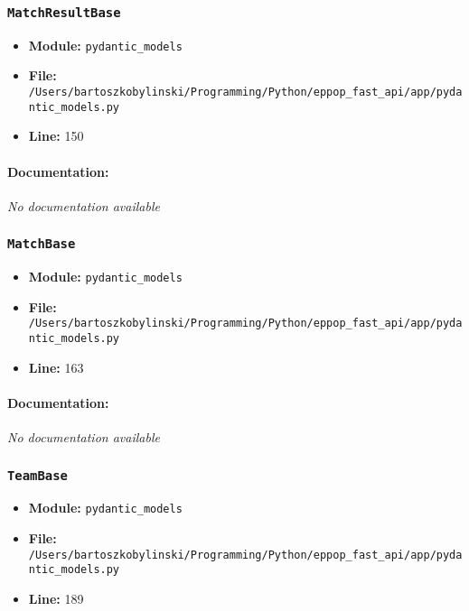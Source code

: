 \documentclass[11pt,a4paper]{article}
\begin{document}
\vspace{1em}
\subsubsection{\texttt{MatchResultBase}}

\begin{itemize}
    \item \textbf{Module:} \texttt{pydantic\_models}
    \item \textbf{File:} \texttt{/Users/bartoszkobylinski/Programming/Python/eppop\_fast\_api/app/pydantic\_models.py}
    \item \textbf{Line:} 150
\end{itemize}

\paragraph{Documentation:} \textit{No documentation available}


\vspace{1em}
\subsubsection{\texttt{MatchBase}}

\begin{itemize}
    \item \textbf{Module:} \texttt{pydantic\_models}
    \item \textbf{File:} \texttt{/Users/bartoszkobylinski/Programming/Python/eppop\_fast\_api/app/pydantic\_models.py}
    \item \textbf{Line:} 163
\end{itemize}

\paragraph{Documentation:} \textit{No documentation available}


\vspace{1em}
\subsubsection{\texttt{TeamBase}}

\begin{itemize}
    \item \textbf{Module:} \texttt{pydantic\_models}
    \item \textbf{File:} \texttt{/Users/bartoszkobylinski/Programming/Python/eppop\_fast\_api/app/pydantic\_models.py}
    \item \textbf{Line:} 189
\end{itemize}
\end{document}
